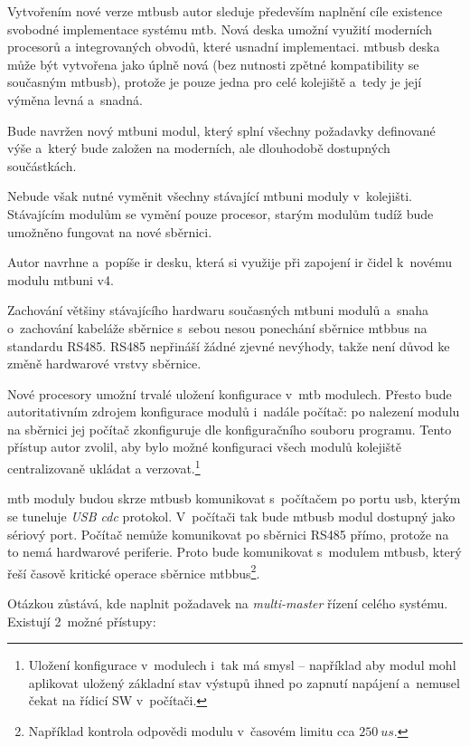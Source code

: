 Vytvořením nové verze \gls{mtbusb} autor sleduje především
naplnění cíle existence svobodné implementace systému \gls{mtb}. Nová deska
umožní využití moderních procesorů a integrovaných obvodů, které usnadní
implementaci. \gls{mtbusb} deska může být vytvořena jako úplně nová (bez nutnosti
zpětné kompatibility se současným \gls{mtbusb}), protože je pouze jedna pro
celé kolejiště a~tedy je její výměna levná a~snadná.

Bude navržen nový \gls{mtbuni} modul, který splní všechny požadavky definované
výše a~který bude založen na moderních, ale dlouhodobě dostupných součástkách.

Nebude však nutné vyměnit všechny stávající \gls{mtbuni} moduly v~kolejišti.
Stávajícím modulům se vymění pouze procesor, starým modulům tudíž bude umožněno
fungovat na nové sběrnici.

Autor navrhne a~popíše \gls{ir} desku, která si využije při zapojení \gls{ir}
čidel k~novému modulu \gls{mtbuni} v4.

Zachování většiny stávajícího hardwaru současných \gls{mtbuni} modulů a~snaha
o~zachování kabeláže sběrnice s~sebou nesou ponechání sběrnice \gls{mtbbus}
na standardu RS485. RS485 nepřináší žádné zjevné nevýhody, takže není důvod
ke změně hardwarové vrstvy sběrnice.

Nové procesory umožní trvalé uložení konfigurace v~\gls{mtb} modulech.
Přesto bude autoritativním zdrojem konfigurace modulů i~nadále počítač: po
nalezení modulu na sběrnici jej počítač zkonfiguruje dle konfiguračního
souboru programu. Tento přístup autor zvolil, aby bylo možné konfiguraci všech
modulů kolejiště centralizovaně ukládat a verzovat.\footnote{Uložení konfigurace
v~modulech i~tak má smysl – například aby modul mohl aplikovat uložený základní
stav výstupů ihned po zapnutí napájení a~nemusel čekat na řídicí SW
v~počítači.}

\gls{mtb} moduly budou skrze \gls{mtbusb} komunikovat s~počítačem po portu
\gls{usb}, kterým se tuneluje \textit{USB \gls{cdc}} protokol. V~počítači tak bude
\gls{mtbusb} modul dostupný jako sériový port. Počítač nemůže komunikovat po
sběrnici RS485 přímo, protože na to nemá hardwarové periferie. Proto bude
komunikovat s~modulem \gls{mtbusb}, který řeší časově kritické operace
sběrnice \gls{mtbbus}\footnote{Například kontrola odpovědi modulu v~časovém
limitu cca $250~us$.}.

Otázkou zůstává, kde naplnit požadavek na \textit{multi-master} řízení celého
systému. Existují 2~možné přístupy:

